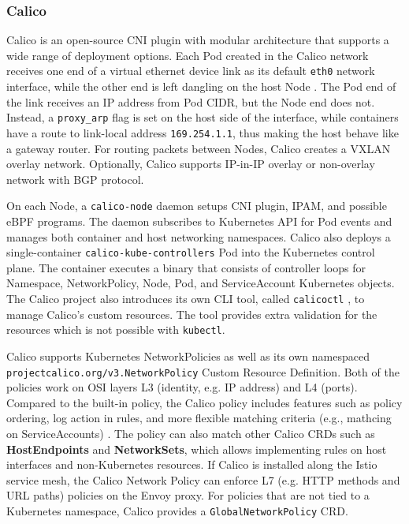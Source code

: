 \documentclass[english, 12pt, a4paper, sci, utf8, a-2b, online]{aaltothesis}
\begin{document}
\subsubsection{Calico}

Calico \cite{calico} is an open-source CNI plugin with modular architecture that supports a wide range of deployment options.
Each Pod created in the Calico network receives one end of a virtual ethernet device link as its default \texttt{eth0} network interface, while the other end is left dangling on the host Node \cite{calico-tkng}.
The Pod end of the link receives an IP address from Pod CIDR, but the Node end does not.
Instead, a \texttt{proxy\_arp} flag is set on the host side of the interface, while containers have a route to link-local address \texttt{169.254.1.1}, thus making the host behave like a gateway router.
For routing packets between Nodes, Calico creates a VXLAN overlay network.
Optionally, Calico supports IP-in-IP overlay or non-overlay network with BGP protocol.

On each Node, a \texttt{calico-node} daemon setups CNI plugin, IPAM, and possible eBPF programs.
The daemon subscribes to Kubernetes API for Pod events and manages both container and host networking namespaces.
Calico also deploys a single-container \texttt{calico-kube-controllers} Pod into the Kubernetes control plane.
The container executes a binary that consists of controller loops for Namespace, NetworkPolicy, Node, Pod, and ServiceAccount Kubernetes objects.
The Calico project also introduces its own CLI tool, called \texttt{calicoctl} \cite{calicoctl}, to manage Calico's custom resources.
The tool provides extra validation for the resources which is not possible with \texttt{kubectl}.

Calico supports Kubernetes NetworkPolicies as well as its own namespaced \\\texttt{projectcalico.org/v3.NetworkPolicy} Custom Resource Definition.
Both of the policies work on OSI layers L3 (identity, e.g. IP address) and L4 (ports).
Compared to the built-in policy, the Calico policy includes features such as policy ordering, log action in rules, and more flexible matching criteria (e.g., mathcing on ServiceAccounts) \cite{calico-network-policy}.
The policy can also match other Calico CRDs such as \textbf{HostEndpoints} and \textbf{NetworkSets}, which allows implementing rules on host interfaces and non-Kubernetes resources.
If Calico is installed along the Istio service mesh, the Calico Network Policy can enforce L7 (e.g. HTTP methods and URL paths) policies on the Envoy proxy. For policies that are not tied to a Kubernetes namespace, Calico provides a \texttt{GlobalNetworkPolicy} CRD.
\end{document}

